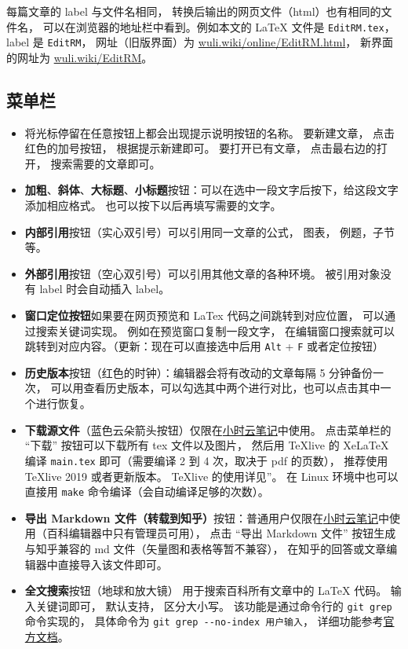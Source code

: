 每篇文章的 label 与文件名相同， 转换后输出的网页文件（html）也有相同的文件名， 可以在浏览器的地址栏中看到。例如本文的 LaTeX 文件是 \verb|EditRM.tex|， label 是 \verb|EditRM|， 网址（旧版界面）为 \href{https://wuli.wiki/online/EditRM.html}{wuli.wiki/online/EditRM.html}， 新界面的网址为 \href{https://wuli.wiki/EditRM}{wuli.wiki/EditRM}。

\subsection{菜单栏}
\begin{itemize}
\item 将光标停留在任意按钮上都会出现提示说明按钮的名称。 要新建文章， 点击红色的加号按钮， 根据提示新建即可。 要打开已有文章， 点击最右边的打开， 搜索需要的文章即可。
\item \textbf{加粗}、\textbf{斜体}、\textbf{大标题}、\textbf{小标题}按钮：可以在选中一段文字后按下，给这段文字添加相应格式。 也可以按下以后再填写需要的文字。
\item \textbf{内部引用}按钮（实心双引号）可以引用同一文章的公式， 图表， 例题，子节等。
\item \textbf{外部引用}按钮（空心双引号）可以引用其他文章的各种环境。 被引用对象没有 label 时会自动插入 label。
\item \textbf{窗口定位按钮}如果要在网页预览和 LaTex 代码之间跳转到对应位置， 可以通过搜索关键词实现。 例如在预览窗口复制一段文字， 在编辑窗口搜索就可以跳转到对应内容。（更新：现在可以直接选中后用 \verb`Alt` + \verb`F` 或者定位按钮）
\item \textbf{历史版本}按钮（红色的时钟）：编辑器会将有改动的文章每隔 5 分钟备份一次， 可以用查看历史版本，可以勾选其中两个进行对比，也可以点击其中一个进行恢复。
\item \textbf{下载源文件}（蓝色云朵箭头按钮）仅限在\href{http://wuli.wiki/note/}{小时云笔记}中使用。 点击菜单栏的 “下载” 按钮可以下载所有 tex 文件以及图片， 然后用 TeXlive 的 XeLaTeX 编译 \verb|main.tex| 即可（需要编译 2 到 4 次，取决于 pdf 的页数）， 推荐使用 TeXlive 2019 或者更新版本。 TeXlive 的使用详见”。 在 Linux 环境中也可以直接用 \verb|make| 命令编译（会自动编译足够的次数）。
\item \textbf{导出 Markdown 文件（转载到知乎）}按钮：普通用户仅限在\href{http://wuli.wiki/note/}{小时云笔记}中使用（百科编辑器中只有管理员可用）， 点击 “导出 Markdown 文件” 按钮生成与知乎兼容的 md 文件（矢量图和表格等暂不兼容）， 在知乎的回答或文章编辑器中直接导入该文件即可。
\item \textbf{全文搜索}按钮（地球和放大镜） 用于搜索百科所有文章中的 LaTeX 代码。 输入关键词即可， 默认支持， 区分大小写。 该功能是通过命令行的 \verb|git grep| 命令实现的， 具体命令为 \verb|git grep --no-index 用户输入|， 详细功能参考\href{https://git-scm.com/docs/git-grep}{官方文档}。
\end{itemize}

